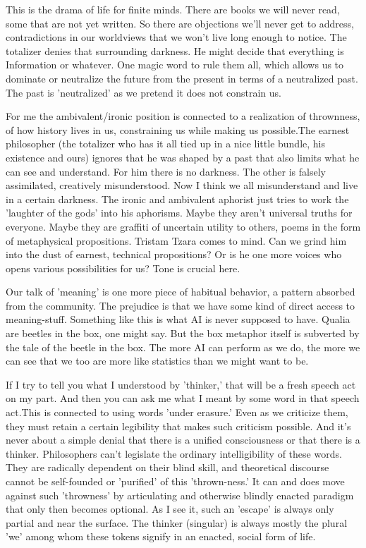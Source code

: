 \documentclass{article}
\begin{document}
This is the drama of life for finite minds. There are books we will never read, some that are not yet written. So there are objections we'll never get to address, contradictions in our worldviews that we won't live long enough to notice. The totalizer denies that surrounding darkness. He might decide that everything is Information or whatever. One magic word to rule them all, which allows us to dominate or neutralize the future from the present in terms of a neutralized past. The past is 'neutralized' as we pretend it does not constrain us.
\newline

For me the ambivalent/ironic position is connected to a realization of thrownness, of how history lives in us, constraining us while making us possible.The earnest philosopher (the totalizer who has it all tied up in a nice little bundle, his existence and ours) ignores that he was shaped by a past that also limits what he can see and understand. For him there is no darkness. The other is falsely assimilated, creatively misunderstood. Now I think we all misunderstand and live in a certain darkness. The ironic and ambivalent aphorist just tries to work the 'laughter of the gods' into his aphorisms. Maybe they aren't universal truths for everyone. Maybe they are graffiti of uncertain utility to others, poems in the form of metaphysical propositions. Tristam Tzara comes to mind. Can we grind him into the dust of earnest, technical propositions? Or is he one more voices who opens various possibilities for us? Tone is crucial here.
\newline

Our talk of 'meaning' is one more piece of habitual behavior, a pattern absorbed from the community. The prejudice is that we have some kind of direct access to meaning-stuff. Something like this is what AI is never supposed to have. Qualia are beetles in the box, one might say. But the box metaphor itself is subverted by the tale of the beetle in the box. The more AI can perform as we do, the more we can see that we too are more like statistics than we might want to be.
\newline

If I try to tell you what I understood by 'thinker,' that will be a fresh speech act on my part. And then you can ask me what I meant by some word in that speech act.This is connected to using words 'under erasure.' Even as we criticize them, they must retain a certain legibility that makes such criticism possible. And it's never about a simple denial that there is a unified consciousness or that there is a thinker. Philosophers can't legislate the ordinary intelligibility of these words. They are radically dependent on their blind skill, and theoretical discourse cannot be self-founded or 'purified' of this 'thrown-ness.' It can and does move against such 'throwness' by articulating and otherwise blindly enacted paradigm that only then becomes optional. As I see it, such an 'escape' is always only partial and near the surface. The thinker (singular) is always mostly the plural 'we' among whom these tokens signify in an enacted, social form of life.
\newline
\end{document}
